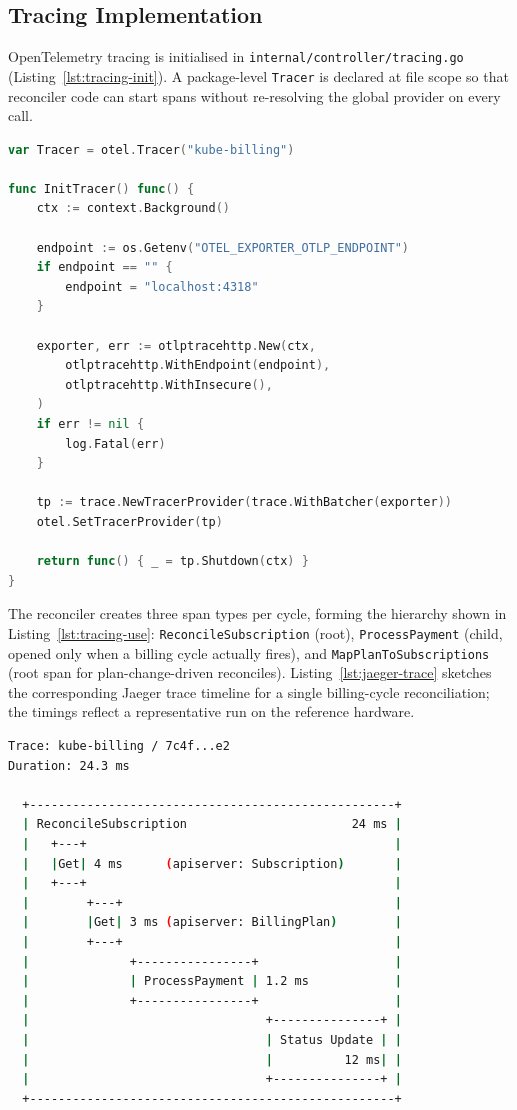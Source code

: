 \subsection{Tracing Implementation}

OpenTelemetry tracing is initialised in \texttt{internal/controller/tracing.go} (Listing~\ref{lst:tracing-init}). A package-level \texttt{Tracer} is declared at file scope so that reconciler code can start spans without re-resolving the global provider on every call.

\begin{lstlisting}[language=Go, caption={Tracer initialisation}, label={lst:tracing-init}]
var Tracer = otel.Tracer("kube-billing")

func InitTracer() func() {
    ctx := context.Background()

    endpoint := os.Getenv("OTEL_EXPORTER_OTLP_ENDPOINT")
    if endpoint == "" {
        endpoint = "localhost:4318"
    }

    exporter, err := otlptracehttp.New(ctx,
        otlptracehttp.WithEndpoint(endpoint),
        otlptracehttp.WithInsecure(),
    )
    if err != nil {
        log.Fatal(err)
    }

    tp := trace.NewTracerProvider(trace.WithBatcher(exporter))
    otel.SetTracerProvider(tp)

    return func() { _ = tp.Shutdown(ctx) }
}
\end{lstlisting}

The reconciler creates three span types per cycle, forming the hierarchy shown in Listing~\ref{lst:tracing-use}: \texttt{ReconcileSubscription} (root), \texttt{ProcessPayment} (child, opened only when a billing cycle actually fires), and \texttt{MapPlanToSubscriptions} (root span for plan-change-driven reconciles). Listing~\ref{lst:jaeger-trace} sketches the corresponding Jaeger trace timeline for a single billing-cycle reconciliation; the timings reflect a representative run on the reference hardware.

\begin{lstlisting}[language=bash, caption={Trace timeline for one billing-cycle reconciliation (Jaeger reproduction)}, label={lst:jaeger-trace}]
Trace: kube-billing / 7c4f...e2
Duration: 24.3 ms

  +---------------------------------------------------+
  | ReconcileSubscription                       24 ms |
  |   +---+                                           |
  |   |Get| 4 ms      (apiserver: Subscription)       |
  |   +---+                                           |
  |        +---+                                      |
  |        |Get| 3 ms (apiserver: BillingPlan)        |
  |        +---+                                      |
  |              +----------------+                   |
  |              | ProcessPayment | 1.2 ms            |
  |              +----------------+                   |
  |                                 +---------------+ |
  |                                 | Status Update | |
  |                                 |          12 ms| |
  |                                 +---------------+ |
  +---------------------------------------------------+
\end{lstlisting}

